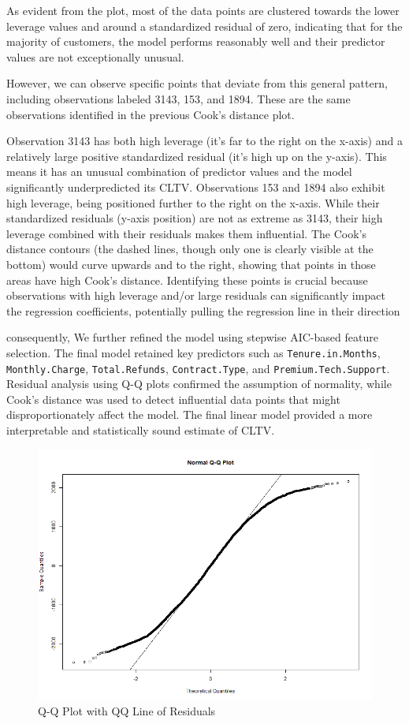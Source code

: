 \documentclass[
]{article}
\begin{document}
As evident from the plot, most of the data points are clustered towards
the lower leverage values and around a standardized residual of zero,
indicating that for the majority of customers, the model performs
reasonably well and their predictor values are not exceptionally
unusual.

However, we can observe specific points that deviate from this general
pattern, including observations labeled 3143, 153, and 1894. These are
the same observations identified in the previous Cook's distance plot.

Observation 3143 has both high leverage (it's far to the right on the
x-axis) and a relatively large positive standardized residual (it's high
up on the y-axis). This means it has an unusual combination of predictor
values and the model significantly underpredicted its CLTV. Observations
153 and 1894 also exhibit high leverage, being positioned further to the
right on the x-axis. While their standardized residuals (y-axis
position) are not as extreme as 3143, their high leverage combined with
their residuals makes them influential. The Cook's distance contours
(the dashed lines, though only one is clearly visible at the bottom)
would curve upwards and to the right, showing that points in those areas
have high Cook's distance. Identifying these points is crucial because
observations with high leverage and/or large residuals can significantly
impact the regression coefficients, potentially pulling the regression
line in their direction

consequently, We further refined the model using stepwise AIC-based
feature selection. The final model retained key predictors such as
\texttt{Tenure.in.Months}, \texttt{Monthly.Charge},
\texttt{Total.Refunds}, \texttt{Contract.Type}, and
\texttt{Premium.Tech.Support}. Residual analysis using Q-Q plots
confirmed the assumption of normality, while Cook's distance was used to
detect influential data points that might disproportionately affect the
model. The final linear model provided a more interpretable and
statistically sound estimate of CLTV.

\begin{figure}

{\centering \includegraphics[width=0.85\linewidth]{Plots/qqline_plot} 

}

\caption{Q-Q Plot with QQ Line of Residuals}\label{fig:qqline-img}
\end{figure}
\end{document}
